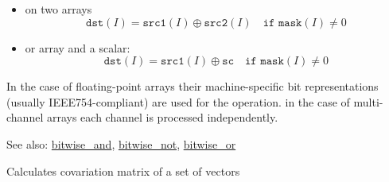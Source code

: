 \begin{itemize}
    \item on two arrays
    \[\texttt{dst}(I) = \texttt{src1}(I) \oplus \texttt{src2}(I)\quad\texttt{if mask}(I)\ne0\]
    \item or array and a scalar:
    \[\texttt{dst}(I) = \texttt{src1}(I) \oplus \texttt{sc}\quad\texttt{if mask}(I)\ne0\]
\end{itemize}

In the case of floating-point arrays their machine-specific bit representations (usually IEEE754-compliant) are used for the operation. in the case of multi-channel arrays each channel is processed independently.

See also: \hyperref[cppfunc.bitwise.and]{bitwise\_and}, \hyperref[cppfunc.bitwise.not]{bitwise\_not}, \hyperref[cppfunc.bitwise.or]{bitwise\_or}

Calculates covariation matrix of a set of vectors

